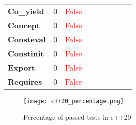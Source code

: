 \documentclass{article}
\begin{document}
\begin{xltabular}{\textwidth}{lcccccccc}
\textbf{{\fontsize{10}{12}\selectfont Co\_yield}}& 0&\textcolor{red}{False} \\[0.5ex]
\textbf{{\fontsize{10}{12}\selectfont Concept}}& 0&\textcolor{red}{False} \\[0.5ex]
\textbf{{\fontsize{10}{12}\selectfont Consteval}}& 0&\textcolor{red}{False} \\[0.5ex]
\textbf{{\fontsize{10}{12}\selectfont Constinit}}& 0&\textcolor{red}{False} \\[0.5ex]
\textbf{{\fontsize{10}{12}\selectfont Export}}& 0&\textcolor{red}{False} \\[0.5ex]
\textbf{{\fontsize{10}{12}\selectfont Requires}}& 0&\textcolor{red}{False} \\[0.5ex]
\bottomrule
\end{xltabular}
\newpage
\begin{figure}[h!]
\centering
\texttt{[image: c++20\_percentage.png]}
\caption{Percentage of passed tests in c++20}
\label{fig:c++20_percentage}
\end{figure}
\newpage
\end{document}
